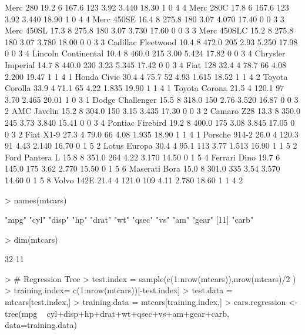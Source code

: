 \documentclass{article}
\begin{document}
\begin{Schunk}
\begin{Soutput}
Merc 280            19.2   6 167.6 123 3.92 3.440 18.30  1  0    4    4
Merc 280C           17.8   6 167.6 123 3.92 3.440 18.90  1  0    4    4
Merc 450SE          16.4   8 275.8 180 3.07 4.070 17.40  0  0    3    3
Merc 450SL          17.3   8 275.8 180 3.07 3.730 17.60  0  0    3    3
Merc 450SLC         15.2   8 275.8 180 3.07 3.780 18.00  0  0    3    3
Cadillac Fleetwood  10.4   8 472.0 205 2.93 5.250 17.98  0  0    3    4
Lincoln Continental 10.4   8 460.0 215 3.00 5.424 17.82  0  0    3    4
Chrysler Imperial   14.7   8 440.0 230 3.23 5.345 17.42  0  0    3    4
Fiat 128            32.4   4  78.7  66 4.08 2.200 19.47  1  1    4    1
Honda Civic         30.4   4  75.7  52 4.93 1.615 18.52  1  1    4    2
Toyota Corolla      33.9   4  71.1  65 4.22 1.835 19.90  1  1    4    1
Toyota Corona       21.5   4 120.1  97 3.70 2.465 20.01  1  0    3    1
Dodge Challenger    15.5   8 318.0 150 2.76 3.520 16.87  0  0    3    2
AMC Javelin         15.2   8 304.0 150 3.15 3.435 17.30  0  0    3    2
Camaro Z28          13.3   8 350.0 245 3.73 3.840 15.41  0  0    3    4
Pontiac Firebird    19.2   8 400.0 175 3.08 3.845 17.05  0  0    3    2
Fiat X1-9           27.3   4  79.0  66 4.08 1.935 18.90  1  1    4    1
Porsche 914-2       26.0   4 120.3  91 4.43 2.140 16.70  0  1    5    2
Lotus Europa        30.4   4  95.1 113 3.77 1.513 16.90  1  1    5    2
Ford Pantera L      15.8   8 351.0 264 4.22 3.170 14.50  0  1    5    4
Ferrari Dino        19.7   6 145.0 175 3.62 2.770 15.50  0  1    5    6
Maserati Bora       15.0   8 301.0 335 3.54 3.570 14.60  0  1    5    8
Volvo 142E          21.4   4 121.0 109 4.11 2.780 18.60  1  1    4    2
\end{Soutput}
\begin{Sinput}
> names(mtcars)
\end{Sinput}
\begin{Soutput}
 [1] "mpg"  "cyl"  "disp" "hp"   "drat" "wt"   "qsec" "vs"   "am"   "gear"
[11] "carb"
\end{Soutput}
\begin{Sinput}
> dim(mtcars)
\end{Sinput}
\begin{Soutput}
[1] 32 11
\end{Soutput}
\begin{Sinput}
> # Regression Tree
> test.index = sample(c(1:nrow(mtcars)),nrow(mtcars)/2 )
> training.index= c(1:nrow(mtcars))[-test.index]
> test.data = mtcars[test.index,]
> training.data = mtcars[training.index,]
> cars.regression <- tree(mpg ~ cyl+disp+hp+drat+wt+qsec+vs+am+gear+carb, data=training.data)

\end{Sinput}
\end{Schunk}
\end{document}
